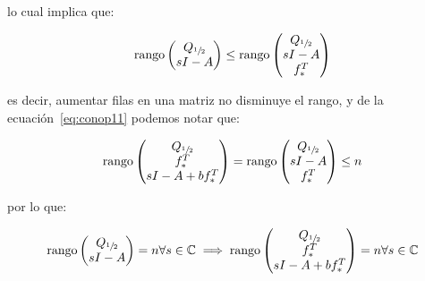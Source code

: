         lo cual implica que:

        \begin{equation*}
            \operatorname{rango}{\begin{pmatrix} Q_{\sfrac{1}{2}} \\ sI - A \end{pmatrix}} \le \operatorname{rango}{\begin{pmatrix} Q_{\sfrac{1}{2}} \\ sI - A \\ f_*^T \end{pmatrix}}
        \end{equation*}

        es decir, aumentar filas en una matriz no disminuye el rango, y de la ecuación~\ref{eq:conop11} podemos notar que:

        \begin{equation}
            \operatorname{rango}{\begin{pmatrix} Q_{\sfrac{1}{2}} \\ f_*^T \\ sI - A + b f_*^T \end{pmatrix}} = \operatorname{rango}{\begin{pmatrix} Q_{\sfrac{1}{2}} \\ sI - A \\ f_*^T \end{pmatrix}} \le n
        \end{equation}

        por lo que:

        \begin{equation}
            \operatorname{rango}{\begin{pmatrix} Q_{\sfrac{1}{2}} \\ sI - A \end{pmatrix}} = n \forall s \in \mathbb{C} \implies \operatorname{rango}{\begin{pmatrix} Q_{\sfrac{1}{2}} \\ f_*^T \\ sI - A + b f_*^T \end{pmatrix}} = n \forall s \in \mathbb{C}
        \end{equation}

